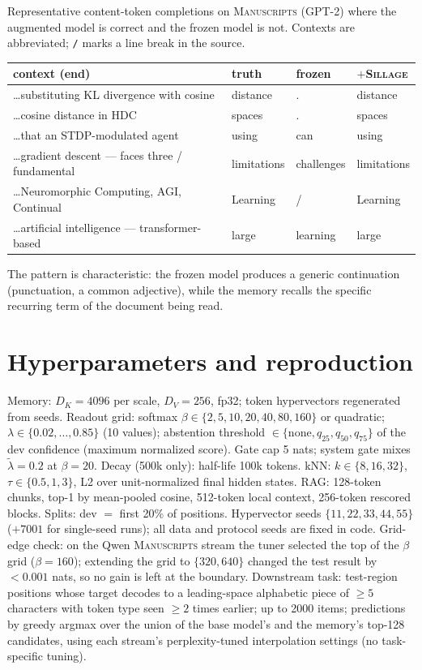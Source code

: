 \documentclass[11pt]{article}
\newcommand{\sillage}{\textsc{Sillage}}
\begin{document}
Representative content-token completions on \textsc{Manuscripts} (GPT-2) where the augmented model is correct and the frozen model is not. Contexts are abbreviated; \verb|/| marks a line break in the source.

\begin{center}\small
\begin{tabular}{@{}p{7.6cm}lll@{}}
\toprule
context (end) & truth & frozen & $+$\sillage{}\\
\midrule
\ldots substituting KL divergence with cosine & distance & . & distance\\
\ldots cosine distance in HDC & spaces & . & spaces\\
\ldots that an STDP-modulated agent & using & can & using\\
\ldots gradient descent --- faces three / fundamental & limitations & challenges & limitations\\
\ldots Neuromorphic Computing, AGI, Continual & Learning & / & Learning\\
\ldots artificial intelligence --- transformer-based & large & learning & large\\
\bottomrule
\end{tabular}
\end{center}

The pattern is characteristic: the frozen model produces a generic continuation (punctuation, a common adjective), while the memory recalls the specific recurring term of the document being read.

\section{Hyperparameters and reproduction}\label{app:params}

Memory: $D_K = 4096$ per scale, $D_V = 256$, fp32; token hypervectors regenerated from seeds. Readout grid: softmax $\beta \in \{2,5,10,20,40,80,160\}$ or quadratic; $\lambda \in \{0.02,\dots,0.85\}$ (10 values); abstention threshold $\in \{\text{none}, q_{25}, q_{50}, q_{75}\}$ of the dev confidence (maximum normalized score). Gate cap 5 nats; system gate mixes $\tilde\lambda = 0.2$ at $\beta = 20$. Decay (500k only): half-life 100k tokens. kNN: $k \in \{8,16,32\}$, $\tau \in \{0.5,1,3\}$, L2 over unit-normalized final hidden states. RAG: 128-token chunks, top-1 by mean-pooled cosine, 512-token local context, 256-token rescored blocks. Splits: dev $=$ first 20\% of positions. Hypervector seeds $\{11,22,33,44,55\}$ ($+7001$ for single-seed runs); all data and protocol seeds are fixed in code. Grid-edge check: on the Qwen \textsc{Manuscripts} stream the tuner selected the top of the $\beta$ grid ($\beta{=}160$); extending the grid to $\{320, 640\}$ changed the test result by $<0.001$ nats, so no gain is left at the boundary. Downstream task: test-region positions whose target decodes to a leading-space alphabetic piece of $\ge 5$ characters with token type seen $\ge 2$ times earlier; up to 2000 items; predictions by greedy argmax over the union of the base model's and the memory's top-128 candidates, using each stream's perplexity-tuned interpolation settings (no task-specific tuning).
\end{document}
